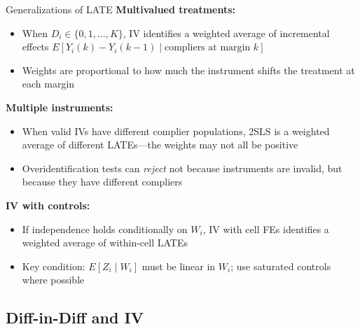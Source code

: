 \documentclass{beamer}
\begin{document}
\begin{frame}{Generalizations of LATE}
\textbf{Multivalued treatments:}
\begin{itemize}
  \item When $D_i\in\{0,1,\ldots,K\}$, IV identifies a weighted average
        of incremental effects $E[Y_i(k)-Y_i(k-1)\mid\text{compliers at margin }k]$
  \item Weights are proportional to how much the instrument shifts the
        treatment at each margin
\end{itemize}

\medskip
\textbf{Multiple instruments:}
\begin{itemize}
  \item When valid IVs have different complier populations, 2SLS is a
        weighted average of different LATEs---the weights may not all be
        positive
  \item Overidentification tests can \emph{reject} not because instruments
        are invalid, but because they have different compliers
\end{itemize}

\medskip
\textbf{IV with controls:}
\begin{itemize}
  \item If independence holds conditionally on $W_i$, IV with cell FEs
        identifies a weighted average of within-cell LATEs
  \item Key condition: $E[Z_i\mid W_i]$ must be linear in $W_i$; use
        saturated controls where possible
\end{itemize}
\end{frame}

\subsection{Diff-in-Diff and IV}
\end{document}
